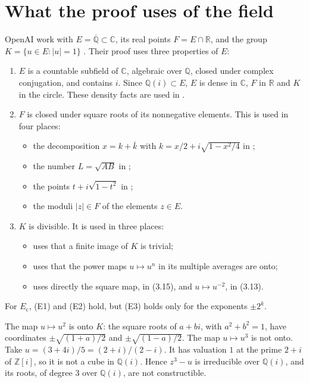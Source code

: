 \documentclass[11pt,a4paper]{amsart}
\theoremstyle{remark}
\newcommand{\C}{\mathbb{C}}
\newcommand{\Q}{\mathbb{Q}}
\newcommand{\R}{\mathbb{R}}
\newcommand{\Z}{\mathbb{Z}}
\newcommand{\Ec}{E_{\mathrm{c}}}
\begin{document}
\section{What the proof uses of the field}\label{sec:field}

OpenAI work with $E=\overline{\Q}\subset\C$, its real points $F=E\cap\R$, and the group $K=\{u\in E:|u|=1\}$
\cite[Def.~2.1]{OpenAI}. Their proof uses three properties of $E$:
\begin{enumerate}
\item[(E1)] $E$ is a countable subfield of $\C$, algebraic over $\Q$, closed under complex conjugation, and contains
$i$. Since $\Q(i)\subset E$, $E$ is dense in $\C$, $F$ in $\R$ and $K$ in the circle. These density facts are used
in \cite[Lemma~2.5, Lemma~4.1, Prop.~4.2]{OpenAI}.
\item[(E2)] $F$ is closed under square roots of its nonnegative elements. This is used in four places:
  \begin{itemize}
  \item the decomposition $x=k+\bar k$ with $k=x/2+i\sqrt{1-x^2/4}$ in \cite[Lemma~2.7]{OpenAI};
  \item the number $L=\sqrt{AB}$ in \cite[Lemma~3.3]{OpenAI};
  \item the points $t+i\sqrt{1-t^2}$ in \cite[\S3.5]{OpenAI};
  \item the moduli $|z|\in F$ of the elements $z\in E$.
  \end{itemize}
\item[(E3)] $K$ is divisible. It is used in three places:
  \begin{itemize}
  \item \cite[Lemma~2.4]{OpenAI} uses that a finite image of $K$ is trivial;
  \item \cite[Lemma~3.2]{OpenAI} uses that the power maps $u\mapsto u^n$ in its multiple averages are onto;
  \item \cite[Lemma~3.3]{OpenAI} uses directly the square map, in (3.15), and $u\mapsto u^{-2}$, in (3.13).
  \end{itemize}
\end{enumerate}
For $\Ec$, (E1) and (E2) hold, but (E3) holds only for the exponents $\pm2^k$.

The map $u\mapsto u^2$ is onto $K$: the square roots of $a+bi$, with $a^2+b^2=1$, have coordinates
$\pm\sqrt{(1+a)/2}$ and $\pm\sqrt{(1-a)/2}$. The map $u\mapsto u^3$ is not onto. Take
$u=(3+4i)/5=(2+i)/(2-i)$. It has valuation $1$ at the prime $2+i$ of $\Z[i]$, so it is not a cube in $\Q(i)$.
Hence $z^3-u$ is irreducible over $\Q(i)$, and its roots, of degree $3$ over $\Q(i)$, are not constructible.
\end{document}
